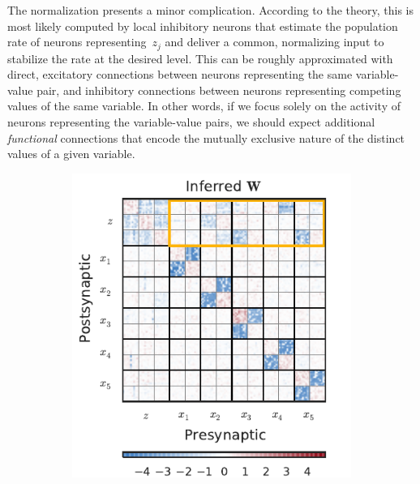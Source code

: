 The normalization presents a minor complication. According to the
theory, this is most likely computed by local inhibitory neurons
that estimate the population rate of neurons representing~$z_j$
and deliver a common, normalizing input to stabilize the rate
at the desired level. This can be roughly approximated with
direct, excitatory connections between neurons representing the same
variable-value pair, and inhibitory connections between neurons
representing competing values of the same variable. In other words,
if we focus solely on the activity of neurons representing the variable-value
pairs, we should expect additional \emph{functional} connections
that encode the mutually exclusive nature of the distinct values
of a given variable.

\begin{figure}[t!]
  \centering
  \begin{subfigure}[b]{2.75in}
   \centering
   \caption{}
   \vspace{-.3in}
   \includegraphics[width=\textwidth]{figures/ch9/mixture_network}
   \label{fig:mixture_network}
  \end{subfigure}
  ~
  \begin{subfigure}[b]{2.75in}

\end{subfigure}
\end{figure}
